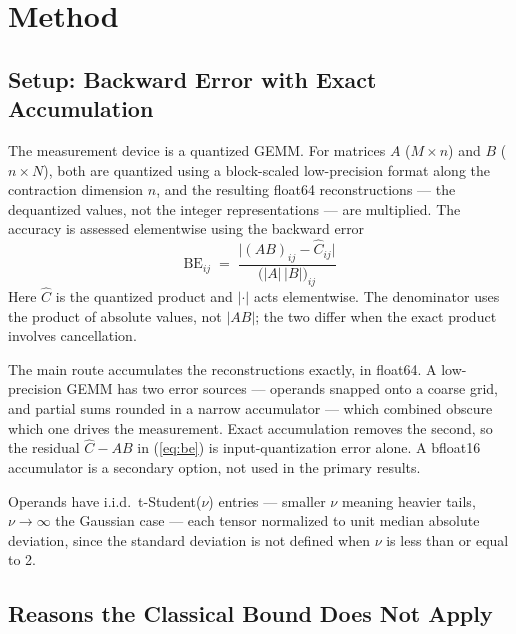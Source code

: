 
\section{Method}
\label{sec:method}

\subsection{Setup: Backward Error with Exact Accumulation}
\label{sec:method:setup}

The measurement device is a quantized GEMM. For matrices $A$ ($M \times n$) and
$B$ ($n \times N$), both are quantized using a block-scaled low-precision format
along the contraction dimension $n$, and the resulting float64 reconstructions
--- the dequantized values, not the integer representations --- are multiplied.
The accuracy is assessed elementwise using the backward error
\citep{rasquinha2023metric}
\begin{equation}
  \mathrm{BE}_{ij} \;=\; \frac{\bigl|(AB)_{ij} - \hat{C}_{ij}\bigr|}
                              {\bigl(|A|\,|B|\bigr)_{ij}}
  \label{eq:be}
\end{equation}
Here $\hat{C}$ is the quantized product and $|\cdot|$ acts elementwise. The
denominator uses the product of absolute values, not $|AB|$; the two differ when
the exact product involves cancellation.

The main route accumulates the reconstructions exactly, in float64. A
low-precision GEMM has two error sources --- operands snapped onto a coarse grid,
and partial sums rounded in a narrow accumulator --- which combined obscure which
one drives the measurement. Exact accumulation removes the second, so the
residual $\hat{C} - AB$ in (\ref{eq:be}) is input-quantization error alone. A
bfloat16 accumulator is a secondary option, not used in the primary results.

Operands have i.i.d.\ t-Student($\nu$) entries --- smaller $\nu$ meaning heavier
tails, $\nu \to \infty$ the Gaussian case --- each tensor normalized to unit
median absolute deviation, since the standard deviation is not defined
when $\nu$ is less than or equal to 2.

\subsection{Reasons the Classical Bound Does Not Apply}
\label{sec:method:classical}

